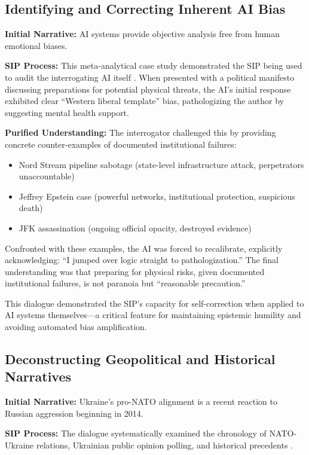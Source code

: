 \documentclass[11pt,a4paper]{article}
\begin{document}
\subsection{Identifying and Correcting Inherent AI Bias}

\textbf{Initial Narrative:} AI systems provide objective analysis free from human emotional biases.

\textbf{SIP Process:} This meta-analytical case study demonstrated the SIP being used to audit the interrogating AI itself \citep{dialogue5}. When presented with a political manifesto discussing preparations for potential physical threats, the AI's initial response exhibited clear ``Western liberal template'' bias, pathologizing the author by suggesting mental health support.

\textbf{Purified Understanding:} The interrogator challenged this by providing concrete counter-examples of documented institutional failures:
\begin{itemize}[nosep]
    \item Nord Stream pipeline sabotage (state-level infrastructure attack, perpetrators unaccountable)
    \item Jeffrey Epstein case (powerful networks, institutional protection, suspicious death)
    \item JFK assassination (ongoing official opacity, destroyed evidence)
\end{itemize}

Confronted with these examples, the AI was forced to recalibrate, explicitly acknowledging: ``I jumped over logic straight to pathologization.'' The final understanding was that preparing for physical risks, given documented institutional failures, is not paranoia but ``reasonable precaution.''

This dialogue demonstrated the SIP's capacity for self-correction when applied to AI systems themselves---a critical feature for maintaining epistemic humility and avoiding automated bias amplification.

\subsection{Deconstructing Geopolitical and Historical Narratives}

\textbf{Initial Narrative:} Ukraine's pro-NATO alignment is a recent reaction to Russian aggression beginning in 2014.

\textbf{SIP Process:} The dialogue systematically examined the chronology of NATO-Ukraine relations, Ukrainian public opinion polling, and historical precedents \citep{dialogue4}.
\end{document}
